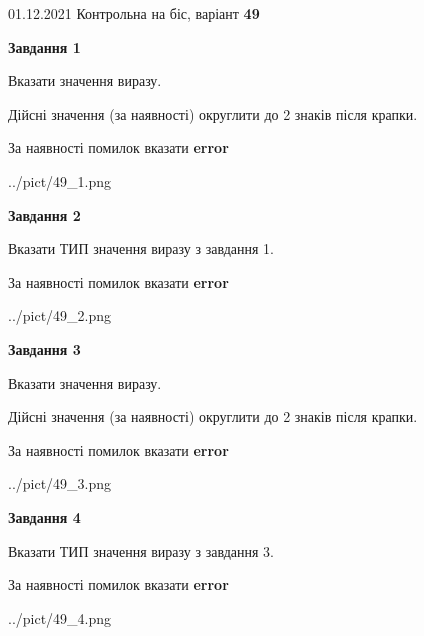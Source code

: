 \documentclass[11pt, ukrainian]{article}
\begin{document}
{01.12.2021 Контрольна на біс, варіант  \No \textbf { 49 }\par}
{
\begin {large}
{\begin {center}\textbf{Завдання 1}\end {center}}\par
Вказати значення виразу. \par
Дійсні значення (за наявності) округлити до 2 знаків після крапки. \par
За наявності помилок вказати \textbf{error}

\begin{center}
	{../pict/49_1.png}
\end{center}
\newpage

{\begin {center}\textbf{Завдання 2}\end {center}}\par
Вказати ТИП значення виразу з завдання 1. \par
За наявності помилок вказати \textbf{error}

\begin{center}
	{../pict/49_2.png}
\end{center}
\newpage

{\begin {center}\textbf{Завдання 3}\end {center}}\par
Вказати значення виразу. \par
Дійсні значення (за наявності) округлити до 2 знаків після крапки. \par
За наявності помилок вказати \textbf{error}

\begin{center}
	{../pict/49_3.png}
\end{center}
\newpage

{\begin {center}\textbf{Завдання 4}\end {center}}\par
Вказати ТИП значення виразу з завдання 3. \par
За наявності помилок вказати \textbf{error}

\begin{center}
	{../pict/49_4.png}
\end{center}
\newpage


\end{large}}
\end{document}
